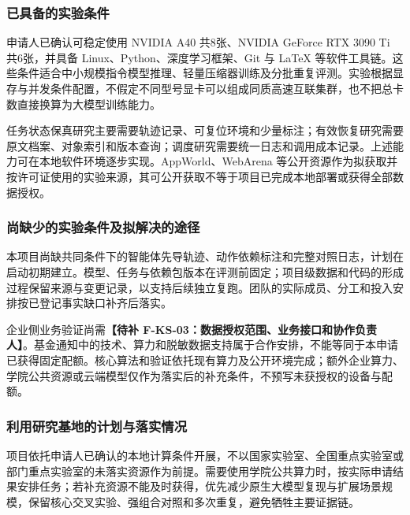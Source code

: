 \justifying
\NSFCBodyText

\subsubsection{已具备的实验条件}
申请人已确认可稳定使用 NVIDIA A40 共8张、NVIDIA GeForce RTX 3090 Ti 共6张，并具备 Linux、Python、深度学习框架、Git 与 LaTeX 等软件工具链。这些条件适合中小规模指令模型推理、轻量压缩器训练及分批重复评测。实验根据显存与并发条件配置，不假定不同型号显卡可以组成同质高速互联集群，也不把总卡数直接换算为大模型训练能力。

任务状态保真研究主要需要轨迹记录、可复位环境和少量标注；有效恢复研究需要原文档案、对象索引和版本查询；调度研究需要统一日志和调用成本记录。上述能力可在本地软件环境逐步实现。AppWorld、WebArena 等公开资源作为拟获取并按许可证使用的实验来源，其可公开获取不等于项目已完成本地部署或获得全部数据授权。

\subsubsection{尚缺少的实验条件及拟解决的途径}
本项目尚缺共同条件下的智能体先导轨迹、动作依赖标注和完整对照日志，计划在启动初期建立。模型、任务与依赖包版本在评测前固定；项目级数据和代码的形成过程保留来源与变更记录，以支持后续独立复跑。团队的实际成员、分工和投入安排按已登记事实缺口补齐后落实。

企业侧业务验证尚需\textbf{【待补 F-KS-03：数据授权范围、业务接口和协作负责人】}。基金通知中的技术、算力和脱敏数据支持属于合作安排，不能等同于本申请已获得固定配额。核心算法和验证依托现有算力及公开环境完成；额外企业算力、学院公共资源或云端模型仅作为落实后的补充条件，不预写未获授权的设备与配额。

\subsubsection{利用研究基地的计划与落实情况}
项目依托申请人已确认的本地计算条件开展，不以国家实验室、全国重点实验室或部门重点实验室的未落实资源作为前提。需要使用学院公共算力时，按实际申请结果安排任务；若补充资源不能及时获得，优先减少原生大模型复现与扩展场景规模，保留核心交叉实验、强组合对照和多次重复，避免牺牲主要证据链。
